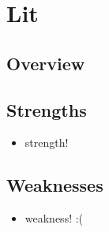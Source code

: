 \section{Lit}
\label{sec:lit}

\subsection{Overview}
\label{subsec:lit:overview}

\subsection{Strengths}
\label{subsec:lit:strengths}
\begin{itemize}
    \item strength! 
\end{itemize}

\subsection{Weaknesses}
\label{subsec:lit:weaknesses}
\begin{itemize}
    \item weakness! :( 
\end{itemize}